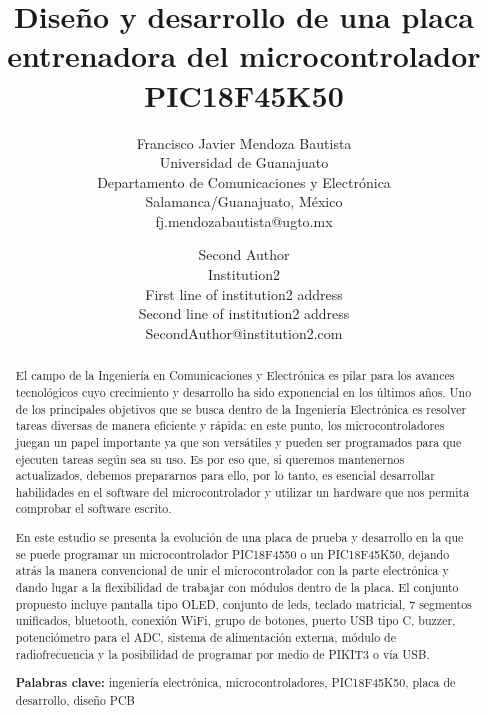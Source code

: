 \documentclass[times, 10pt,twocolumn]{article}
\begin{document}
\title{Diseño y desarrollo de una placa entrenadora del microcontrolador PIC18F45K50}

\author{Francisco Javier Mendoza Bautista\\
Universidad de Guanajuato\\ Departamento de Comunicaciones y Electrónica \\  
Salamanca/Guanajuato, México\\fj.mendozabautista@ugto.mx\\
\and
Second Author\\
Institution2\\
First line of institution2 address\\ Second line of institution2 address\\ 
SecondAuthor@institution2.com\\
}

\maketitle
\thispagestyle{empty}

\begin{abstract}
El campo de la Ingeniería en Comunicaciones y Electrónica es pilar para los avances tecnológicos cuyo crecimiento y desarrollo ha sido exponencial en los últimos años. Uno de los principales objetivos que se busca dentro de la Ingeniería Electrónica es resolver tareas diversas de manera eficiente y rápida: en este punto, los microcontroladores juegan un papel importante ya que son versátiles y pueden ser programados para que ejecuten tareas según sea su uso. Es por eso que, si queremos mantenernos actualizados, debemos prepararnos para ello, por lo tanto, es esencial desarrollar habilidades en el
software del microcontrolador y utilizar un hardware que nos permita comprobar el software escrito. 


En este estudio se presenta la evolución de una placa de prueba y desarrollo en la que se puede programar un microcontrolador PIC18F4550 o un PIC18F45K50,
dejando atrás la manera convencional de unir el microcontrolador con la parte
electrónica y dando lugar a la flexibilidad de trabajar con módulos dentro de la placa. El conjunto propuesto incluye pantalla tipo OLED, conjunto de leds, teclado matricial, 7 segmentos unificados, bluetooth, conexión WiFi, grupo de botones, puerto USB tipo C, buzzer, potenciómetro para el ADC, sistema de alimentación externa, módulo de radiofrecuencia y la posibilidad de programar por medio de PIKIT3 o vía USB.

\textbf{Palabras clave:} ingeniería electrónica, microcontroladores, PIC18F45K50, placa de desarrollo, diseño PCB
\end{abstract}
\end{document}
